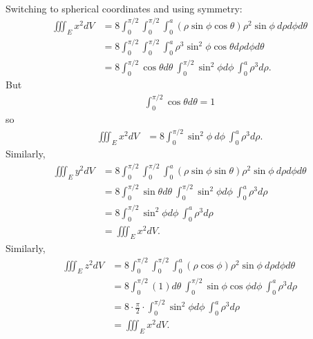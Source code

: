 \item %
 \\
Switching to spherical coordinates and using symmetry:
\begin{align*}
  \iiint_E x^2 dV 
  &= 8 {\int_0^{\pi/2} \!\! \int_{0}^{\pi/2} \!\! \int_{0}^a} (\rho\sin\phi\cos\theta) \rho^2\sin\phi \ d\rho d\phi d\theta \\
  &= 8 {\int_0^{\pi/2} \!\! \int_{0}^{\pi/2} \!\! \int_{0}^a} \rho^3\sin^2\phi\cos\theta d\rho d\phi d\theta \\
  &= 8 \int_0^{\pi/2} \cos\theta d\theta \ \int_{0}^{\pi/2} \sin^2\phi d\phi  \ \int_{0}^a \rho^3 d\rho  .
\end{align*}
But
\begin{align*}
 \int_0^{\pi/2} \cos\theta d\theta =1
\end{align*}
so
\begin{align*}
  \iiint_E x^2 dV
  &= 8 \int_{0}^{\pi/2} \sin^2\phi \ d\phi  \ \int_{0}^a \rho^3 d\rho.
\end{align*}
Similarly, 
\begin{align*}
  \iiint_E y^2 dV 
  &= 8 {\int_0^{\pi/2} \!\! \int_{0}^{\pi/2} \!\! \int_{0}^a} (\rho\sin\phi\sin\theta) \rho^2\sin\phi \ d\rho d\phi d\theta \\
  &= 8 \int_0^{\pi/2} \sin\theta d\theta \ \int_{0}^{\pi/2} \sin^2\phi d\phi  \ \int_{0}^a \rho^3 d\rho \\
  &= 8  \int_{0}^{\pi/2} \sin^2\phi d\phi  \ \int_{0}^a \rho^3 d\rho \\
  &= \iiint_E x^2 dV .
\end{align*}
Similarly, 
\begin{align*}
  \iiint_E z^2 dV 
  &= 8 {\int_0^{\pi/2} \!\! \int_{0}^{\pi/2} \!\! \int_{0}^a} (\rho\cos\phi) \rho^2\sin\phi \ d\rho d\phi d\theta \\
  &= 8 \int_0^{\pi/2} (1) d\theta \ \int_{0}^{\pi/2} \sin\phi\cos\phi d\phi  \ \int_{0}^a \rho^3 d\rho \\
  &= 8 \cdot  \frac{\pi}{2} \cdot \int_{0}^{\pi/2} \sin^2\phi d\phi  \ \int_{0}^a \rho^3 d\rho \\
  &= \iiint_E x^2 dV .
\end{align*}
\EEN %
